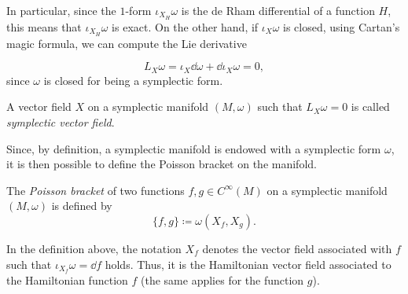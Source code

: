 In particular, since the $1$-form $\iota_{X_H} \omega$ is the de Rham differential of a function $H$, this means that $\iota_{X_H} \omega$ is exact.
On the other hand, if $\iota_X \omega$ is closed, using Cartan's magic formula, we can compute the Lie derivative

\begin{equation*}
    L_X \omega = \iota_X \dd \omega + \dd \iota_X \omega = 0,
\end{equation*}
since $\omega$ is closed for being a symplectic form.

\begin{definition}
    A vector field $X$ on a symplectic manifold $(M, \omega)$ such that $L_X \omega = 0$ is called \emph{symplectic vector field}.
\end{definition}

Since, by definition, a symplectic manifold is endowed with a symplectic form $\omega$, it is then possible to define the Poisson bracket on the manifold.
\begin{definition}
    The \emph{Poisson bracket} of two functions $f, g \in C^\infty(M)$ on a symplectic manifold $(M, \omega)$ is defined by
    \begin{equation*}
        \{f, g\} \coloneqq \omega(X_f, X_g) .
    \end{equation*}
\end{definition}
In the definition above, the notation $X_f$ denotes the vector field associated with $f$ such that $\iota_{X_f} \omega = \dd f$ holds.
Thus, it is the Hamiltonian vector field associated to the Hamiltonian function $f$ (the same applies for the function $g$).